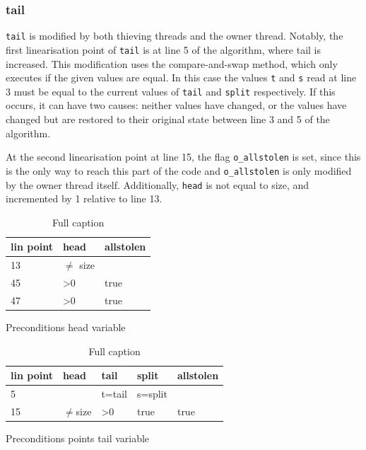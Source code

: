 \documentclass{sig-alternate-br}
\begin{document}
\subsubsection{tail}
\texttt{tail} is modified by both thieving threads and the owner thread.
Notably, the first linearisation point of \texttt{tail} is at line 5 of the algorithm, where tail is increased.
This modification uses the compare-and-swap method, which only executes if the given values are equal.
In this case the values \texttt{t} and \texttt{s} read at line 3 must be equal to the current values of \texttt{tail} and \texttt{split} respectively.
If this occurs, it can have two causes: neither values have changed, or the values have changed but are restored to their original state between line 3 and 5 of the algorithm.

At the second linearisation point at line 15, the flag \texttt{o\_allstolen} is set, since this is the only way to reach this part of the code and \texttt{o\_allstolen} is only modified by the owner thread itself.
Additionally, \texttt{head} is not equal to size, and incremented by 1 relative to line 13.

\begin{table}[h]
	\begin{subtable}[h]{0.45\textwidth}
		\centering
		\begin{tabular}{|l|l|l|}
			\hline
			\textbf{lin point} & \textbf{head}  & \textbf{allstolen} \\ \hline
			13                 & $\neq$ size       &                    \\ \hline
			45                 & \textgreater 0 & true               \\ \hline
			47                 & \textgreater 0 & true               \\ \hline
		\end{tabular}
		\caption{Preconditions head variable}
		\label{tab:init.head}
	\end{subtable}
	\hfill
	\begin{subtable}[h]{0.45\textwidth}
		\centering
		\begin{tabular}{|l|l|l|l|l|}
			\hline
			\textbf{lin point} & \textbf{head} & \textbf{tail}  & \textbf{split} & \textbf{allstolen} \\ \hline
			5                  &               & t=tail         & s=split        &                    \\ \hline
			15                 & $\neq$size    & \textgreater 0 & true           & true               \\ \hline
		\end{tabular}
		\caption{Preconditions points tail variable}
		\label{tab:init.tail}
	\end{subtable}
	\caption{Full caption}
\end{table}
\end{document}
